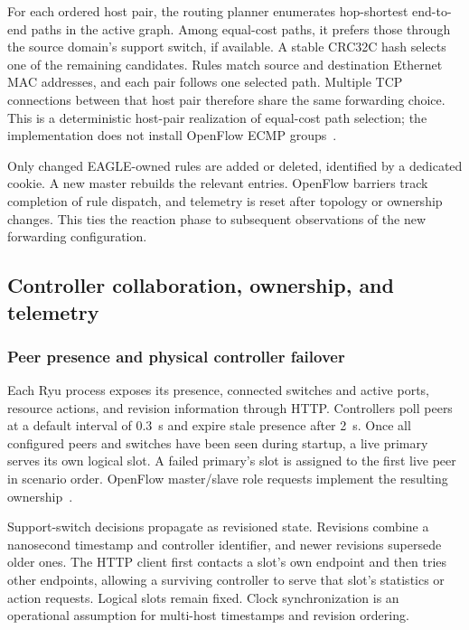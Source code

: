 \documentclass[11pt,a4paper]{article}
\begin{document}
For each ordered host pair, the routing planner enumerates hop-shortest
end-to-end paths in the active graph. Among equal-cost paths, it prefers those
through the source domain's support switch, if available. A stable CRC32C hash
selects one of the remaining candidates. Rules match source and destination
Ethernet MAC addresses, and each pair follows one selected path. Multiple TCP
connections between that host pair therefore share the same forwarding choice.
This is a deterministic host-pair realization of equal-cost path selection;
the implementation does not install OpenFlow ECMP groups~\cite{code-routing}.

Only changed EAGLE-owned rules are added or deleted, identified by a dedicated
cookie. A new master rebuilds the relevant entries. OpenFlow barriers track
completion of rule dispatch, and telemetry is reset after topology or ownership
changes. This ties the reaction phase to subsequent observations of the new
forwarding configuration.

\subsection{Controller collaboration, ownership, and telemetry}
\label{sec:telemetry}

\subsubsection{Peer presence and physical controller failover}

Each Ryu process exposes its presence, connected switches and active ports,
resource actions, and revision information through HTTP. Controllers poll peers
at a default interval of 0.3~s and expire stale presence after 2~s. Once all
configured peers and switches have been seen during startup, a live primary
serves its own logical slot. A failed primary's slot is assigned to the first
live peer in scenario order. OpenFlow master/slave role requests implement
the resulting ownership~\cite{code-routing}.

Support-switch decisions propagate as revisioned state. Revisions combine a
nanosecond timestamp and controller identifier, and newer revisions supersede
older ones. The HTTP client first contacts a slot's own endpoint and then tries
other endpoints, allowing a surviving controller to serve that slot's statistics
or action requests. Logical slots remain fixed. Clock synchronization is an
operational assumption for multi-host timestamps and revision ordering.
\end{document}
